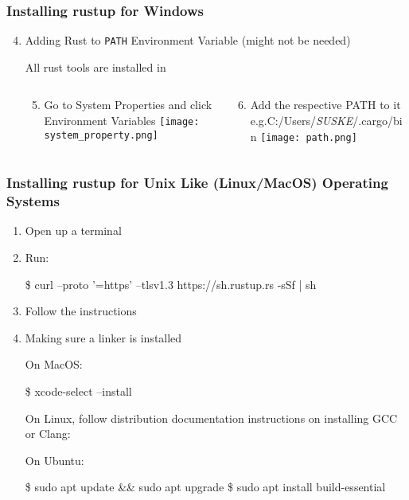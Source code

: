 \documentclass{beamer}
\begin{document}
\begin{frame}
  \frametitle{Installing rustup for Windows}
  \begin{enumerate}
          \setcounter{enumi}{3}
    \item<+->{Adding Rust to \lstinline[backgroundcolor=backcolour]{PATH} Environment Variable (might not be needed)

          All rust tools are installed in 
          }
          \begin{columns}[t]
              \begin{column}{.5\linewidth}
                \begin{enumerate}
                        \setcounter{enumii}{4}
                  \item<+->{Go to System Properties and click Environment Variables}
                        \texttt{[image: system\_property.png]}
                \end{enumerate}
              \end{column}
              \begin{column}{.5\linewidth}
                \begin{enumerate}
                        \setcounter{enumii}{5}
                  \item<+->{Add the respective PATH to it e.g.C:/Users/\emph{SUSKE}/.cargo/bin}
                        \texttt{[image: path.png]}
                \end{enumerate}
              \end{column}
          \end{columns}
  \end{enumerate}
\end{frame}


\begin{frame}[fragile]
  \frametitle{Installing rustup for Unix Like (Linux/MacOS) Operating Systems}
  \begin{enumerate}
    \item{Open up a terminal}
    \item{Run:

\begin{semiverbatim}
\$ curl --proto '=https' --tlsv1.3 https://sh.rustup.rs -sSf
 | sh
\end{semiverbatim}
          }
    \item{Follow the instructions}
    \item{Making sure a linker is installed

          On MacOS:\@
\begin{semiverbatim}
\$ xcode-select --install
\end{semiverbatim}

          On Linux, follow distribution documentation instructions on installing GCC or Clang:

          On Ubuntu:
\begin{semiverbatim}
\$ sudo apt update \&\& sudo apt upgrade
\$ sudo apt install build-essential
\end{semiverbatim}
          }
  \end{enumerate}
\end{frame}
\end{document}
